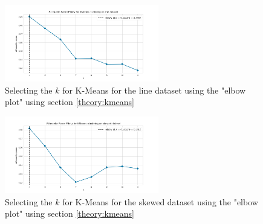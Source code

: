 \begin{figure}[H]
  \includegraphics[width=0.6\textwidth]{Method/images/synthetic-datasets-k/line-dataset_elbow.png}
  \caption{Selecting the $k$ for K-Means for the line dataset using the "elbow plot" using section \ref{theory:kmeans}}
  \label{hyperparameters:k-means-line-dataset}
\end{figure}

\begin{figure}[H]
  \includegraphics[width=0.6\textwidth]{Method/images/synthetic-datasets-k/skewed-dataset_elbow.png}
  \caption{Selecting the $k$ for K-Means for the skewed dataset using the "elbow plot" using section \ref{theory:kmeans}}
  \label{hyperparameters:k-means-skewed-dataset}
\end{figure}